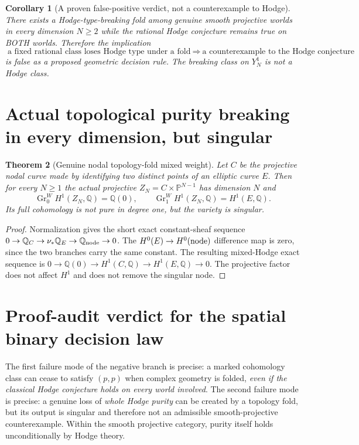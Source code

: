 \documentclass[11pt]{article}
\newtheorem{theorem}{Theorem}
\newtheorem{corollary}[theorem]{Corollary}
\begin{document}
\begin{corollary}[A proven false-positive verdict, not a counterexample to Hodge]
There exists a Hodge-type-breaking fold among genuine smooth
projective worlds in every dimension $N\ge2$ while the
rational Hodge conjecture remains true on BOTH worlds.
Therefore the implication
\[
 \boxed{\text{a fixed rational class loses Hodge type under a fold}
 \ \Longrightarrow\ \text{a counterexample to the Hodge conjecture}}
 \tag{5}
\]
is false as a proposed geometric decision rule.
The breaking class on $Y_N^1$ is not a Hodge class.
\end{corollary}

\section{Actual topological purity breaking in every dimension, but singular}
\begin{theorem}[Genuine nodal topology-fold mixed weight]
Let $C$ be the projective nodal curve made by identifying
two distinct points of an elliptic curve $E$.
Then for every $N\ge1$ the actual projective
$Z_N=C\times\mathbb P^{N-1}$ has dimension $N$
and
\[
 \boxed{\operatorname{Gr}^W_0H^1(Z_N,\mathbb Q)=\mathbb Q(0),
 \qquad\operatorname{Gr}^W_1H^1(Z_N,\mathbb Q)=H^1(E,\mathbb Q).}\tag{6}
\]
Its full cohomology is not pure in degree one,
but the variety is singular.
\end{theorem}
\begin{proof}
Normalization gives the short exact constant-sheaf
sequence
$0\to\mathbb Q_C\to\nu_*\mathbb Q_E\to\mathbb Q_{\rm node}\to0$.
The $H^0(E)\to H^0(\rm node)$ difference map is zero,
since the two branches carry the same constant.
The resulting mixed-Hodge exact sequence is
$0\to\mathbb Q(0)\to H^1(C,\mathbb Q)\to H^1(E,\mathbb Q)\to0$.
The projective factor does not affect $H^1$ and
does not remove the singular node.
\end{proof}

\section{Proof-audit verdict for the spatial binary decision law}
The first failure mode of the negative branch is precise:
a marked cohomology class can cease to satisfy $(p,p)$
when complex geometry is folded, \emph{even if the classical
Hodge conjecture holds on every world involved}.
The second failure mode is precise:
a genuine loss of \emph{whole Hodge purity} can be
created by a topology fold, but its output is singular
and therefore not an admissible smooth-projective
counterexample. Within the smooth projective category,
purity itself holds unconditionally by Hodge theory.
\end{document}
